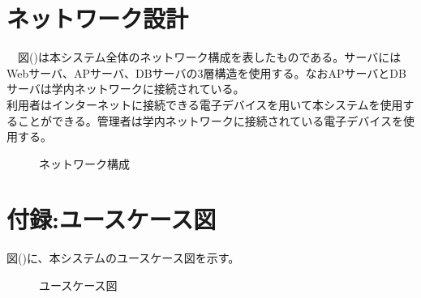 \documentclass[a4j]{jarticle}
\begin{document}
\section{ネットワーク設計}
　図()は本システム全体のネットワーク構成を表したものである。サーバにはWebサーバ、APサーバ、DBサーバの3層構造を使用する。なおAPサーバとDBサーバは学内ネットワークに接続されている。\\
利用者はインターネットに接続できる電子デバイスを用いて本システムを使用することができる。管理者は学内ネットワークに接続されている電子デバイスを使用する。
\begin{figure}[h!]
\begin{center}
\caption{ネットワーク構成}
\label{network:networktest}
\end{center}
\end{figure}



\section*{付録:ユースケース図}
図()に、本システムのユースケース図を示す。
\begin{figure}[h!]
\begin{center}
\caption{ユースケース図}
\label{UseCase:UseCasetest}
\end{center}
\end{figure}

% 
%
%
%

% 
\end{document}
